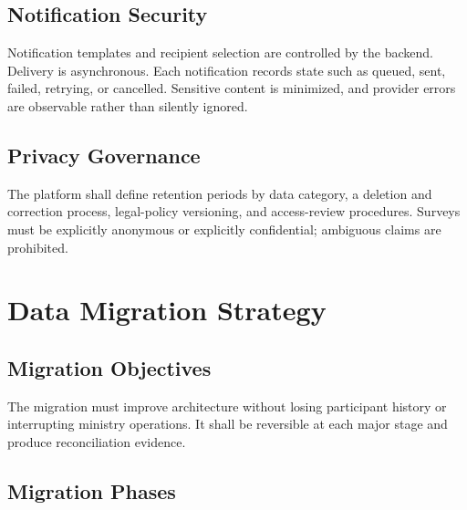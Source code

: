 \documentclass[11pt,a4paper,oneside]{report}
\begin{document}
\section{Notification Security}

Notification templates and recipient selection are controlled by the backend. Delivery is asynchronous. Each notification records state such as queued, sent, failed, retrying, or cancelled. Sensitive content is minimized, and provider errors are observable rather than silently ignored.

\section{Privacy Governance}

The platform shall define retention periods by data category, a deletion and correction process, legal-policy versioning, and access-review procedures. Surveys must be explicitly anonymous or explicitly confidential; ambiguous claims are prohibited.

\chapter{Data Migration Strategy}

\section{Migration Objectives}

The migration must improve architecture without losing participant history or interrupting ministry operations. It shall be reversible at each major stage and produce reconciliation evidence.

\section{Migration Phases}
\end{document}

